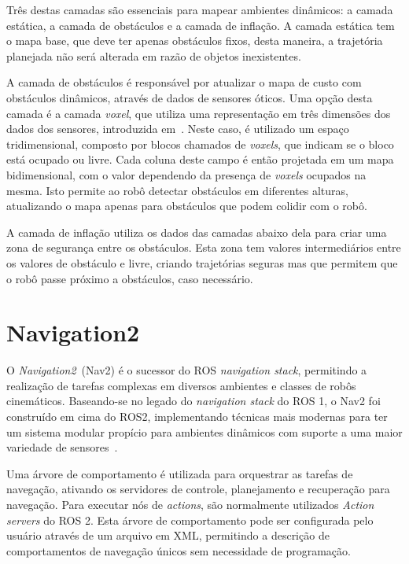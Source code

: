 \documentclass[repeatfields,xlists,xpacks,oneside,yearsonly]{ufrgscca}
\begin{document}
Três destas camadas são essenciais para mapear ambientes dinâmicos: a
camada estática, a camada de obstáculos e a camada de inflação. A
camada estática tem o mapa base, que deve ter apenas obstáculos
fixos, desta maneira, a trajetória planejada não será alterada em
razão de objetos inexistentes.

A camada de obstáculos é responsável por atualizar o mapa de custo
com obstáculos dinâmicos, através de dados de sensores óticos. Uma
opção desta camada é a camada \textit{voxel}, que utiliza uma
representação em três dimensões dos dados dos sensores, introduzida
em~\textcite{office_marathon}. Neste caso, é utilizado um espaço
tridimensional, composto por blocos chamados de \textit{voxels}, que
indicam se o bloco está ocupado ou livre. Cada coluna deste campo é
então projetada em um mapa bidimensional, com o valor dependendo da
presença de \textit{voxels} ocupados na mesma. Isto permite ao robô
detectar obstáculos em diferentes alturas, atualizando o mapa apenas
para obstáculos que podem colidir com o robô.

A camada de inflação utiliza os dados das camadas abaixo dela para
criar uma zona de segurança entre os obstáculos. Esta zona tem
valores intermediários entre os valores de obstáculo e livre, criando
trajetórias seguras mas que permitem que o robô passe próximo a
obstáculos, caso necessário.

\section{Navigation2}


O \textit{Navigation2}~(Nav2) é o sucessor do ROS \textit{navigation
    stack}, permitindo a realização de tarefas complexas em diversos
ambientes e classes de robôs cinemáticos. Baseando-se no legado do
\textit{navigation stack} do ROS 1, o Nav2 foi construído em cima do
ROS2, implementando técnicas mais modernas para ter um sistema
modular propício para ambientes dinâmicos com suporte a uma maior
variedade de sensores~\cite{Nav2}.

Uma árvore de comportamento é utilizada para orquestrar as tarefas de
navegação, ativando os servidores de controle, planejamento e
recuperação para navegação. Para executar nós de \textit{actions},
são normalmente utilizados \textit{Action servers} do ROS 2. Esta
árvore de comportamento pode ser configurada pelo usuário através de
um arquivo em XML, permitindo a descrição de comportamentos de
navegação únicos sem necessidade de programação.
\end{document}
